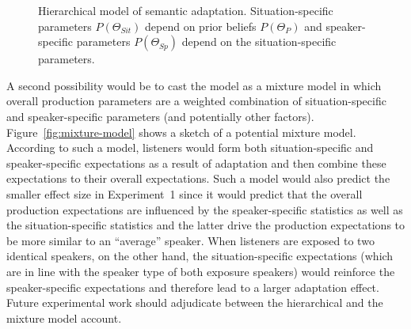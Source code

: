 \begin{figure}
\center
{}
\caption{Hierarchical model of semantic adaptation. Situation-specific parameters $P(\Theta_{Sit})$ depend on prior beliefs $P(\Theta_P)$ and speaker-specific parameters $P(\Theta_{Sp})$ depend on the situation-specific parameters. \label{fig:model}}
\end{figure}



A second possibility would be to cast the model as a mixture model in which overall production parameters are a 
weighted combination of situation-specific and speaker-specific parameters (and potentially other factors). 
Figure~\ref{fig:mixture-model} shows a sketch of a potential mixture model.
According to such a model, listeners would form both situation-specific and speaker-specific
expectations as a result of adaptation and then combine these expectations to their overall expectations. 
Such a model would also predict the smaller effect size in Experiment~1 since it would predict
that the overall production expectations are influenced by the speaker-specific statistics as 
well as the situation-specific statistics and the latter drive the production expectations to be more similar to
an ``average'' speaker. When listeners are exposed to two identical speakers, on the other hand, the 
situation-specific expectations (which are in line with the speaker type of both exposure speakers) 
would reinforce the speaker-specific expectations and therefore lead to a larger adaptation effect. Future experimental work should adjudicate between the hierarchical and the mixture model account.

